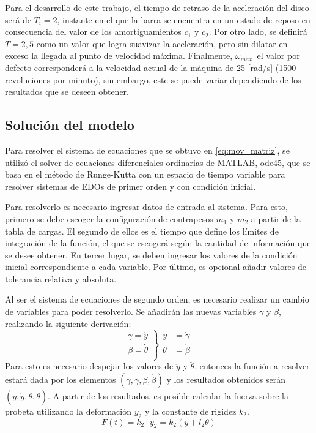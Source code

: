 Para el desarrollo de este trabajo, el tiempo de retraso de la aceleración del disco será de $T_i=2$, instante en el que la barra se encuentra en un estado de reposo en consecuencia del valor de los amortiguamientos $c_1$ y $c_2$. Por otro lado, se definirá $T = 2,5$ como un valor que logra suavizar la aceleración, pero sin dilatar en exceso la llegada al punto de velocidad máxima. Finalmente, $\omega_{max}\,$ el valor por defecto corresponderá a la velocidad actual de la máquina de 25 [rad/s] (1500 revoluciones por minuto), sin embargo, este se puede variar dependiendo de los resultados que se deseen obtener. 

\subsection{Solución del modelo}
Para resolver el sistema de ecuaciones que se obtuvo en \ref{eq:mov_matriz}, se utilizó el solver de ecuaciones diferenciales ordinarias de MATLAB, ode45, que se basa en el método de Runge-Kutta con un espacio de tiempo variable para resolver sistemas de EDOs de primer orden y con condición inicial. \cite{ode45}

Para resolverlo es necesario ingresar datos de entrada al sistema. Para esto, primero se debe escoger la configuración de contrapesos $m_1$ y $m_2$ a partir de la tabla de cargas. El segundo de ellos es el tiempo que define los límites de integración de la función, el que se escogerá según la cantidad de información que se desee obtener. En tercer lugar, se deben ingresar los valores de la condición inicial correspondiente a cada variable. Por último, es opcional añadir valores de tolerancia relativa y absoluta.

Al ser el sistema de ecuaciones de segundo orden, es necesario realizar un cambio de variables para poder resolverlo. Se añadirán las nuevas variables $\gamma$ y $\beta$, realizando la siguiente derivación:
\[ \left. 
\begin{array}{ll}
	\gamma = \dot{y}\\
	\beta = \dot{\theta}\\
\end{array}
\right\}
\begin{array}{ll}
	\ddot{y} &= \dot{\gamma}\\
	\ddot{\theta} &= \dot{\beta}\\
\end{array}\]
Para esto es necesario despejar los valores de $\ddot{y}$ y $\ddot{\theta}$, entonces la función a resolver estará dada por los elementos $(\gamma, \dot{\gamma}, \beta, \dot{\beta})$ y los resultados obtenidos serán $(y, \dot{y}, \theta, \dot{\theta})$. A partir de los resultados, es posible calcular la fuerza sobre la probeta utilizando la deformación $y_2$ y la constante de rigidez $k_2$.
\begin{equation}\label{eq:fuerza_probeta}
	F(t) = k_2 \cdot y_2 = k_2(y + l_2\theta)
\end{equation}

